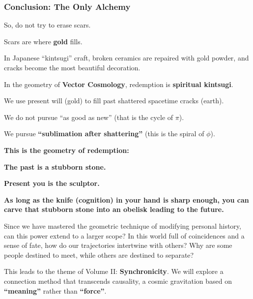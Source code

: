 \subsubsection{Conclusion: The Only Alchemy}

So, do not try to erase scars.

Scars are where \textbf{gold} fills.

In Japanese ``kintsugi'' craft, broken ceramics are repaired with gold powder, and cracks become the most beautiful decoration.

In the geometry of \textbf{Vector Cosmology}, redemption is \textbf{spiritual kintsugi}.

We use present will (gold) to fill past shattered spacetime cracks (earth).

We do not pursue ``as good as new'' (that is the cycle of $\pi$).

We pursue \textbf{``sublimation after shattering''} (this is the spiral of $\phi$).

\textbf{This is the geometry of redemption:}

\textbf{The past is a stubborn stone.}

\textbf{Present you is the sculptor.}

\textbf{As long as the knife (cognition) in your hand is sharp enough, you can carve that stubborn stone into an obelisk leading to the future.}

Since we have mastered the geometric technique of modifying personal history, can this power extend to a larger scope? In this world full of coincidences and a sense of fate, how do our trajectories intertwine with others? Why are some people destined to meet, while others are destined to separate?

This leads to the theme of Volume II: \textbf{Synchronicity}. We will explore a connection method that transcends causality, a cosmic gravitation based on \textbf{``meaning''} rather than \textbf{``force''}.

